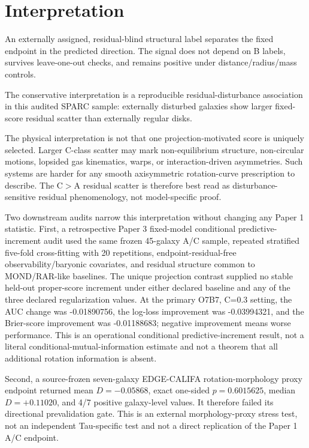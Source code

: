 \documentclass[11pt]{article}
\begin{document}
\section{Interpretation}
An externally assigned, residual-blind structural label separates the fixed endpoint in the predicted direction. The signal does not depend on B labels, survives leave-one-out checks, and remains positive under distance/radius/mass controls.

The conservative interpretation is a reproducible residual-disturbance association in this audited SPARC sample: externally disturbed galaxies show larger fixed-score residual scatter than externally regular disks.

The physical interpretation is not that one projection-motivated score is uniquely selected. Larger C-class scatter may mark non-equilibrium structure, non-circular motions, lopsided gas kinematics, warps, or interaction-driven asymmetries. Such systems are harder for any smooth axisymmetric rotation-curve prescription to describe. The C$>$A residual scatter is therefore best read as disturbance-sensitive residual phenomenology, not model-specific proof.

Two downstream audits narrow this interpretation without changing any Paper 1 statistic. First, a retrospective Paper 3 fixed-model conditional predictive-increment audit used the same frozen 45-galaxy A/C sample, repeated stratified five-fold cross-fitting with 20 repetitions, endpoint-residual-free observability/baryonic covariates, and residual structure common to MOND/RAR-like baselines. The unique projection contrast supplied no stable held-out proper-score increment under either declared baseline and any of the three declared regularization values. At the primary O7B7, C=0.3 setting, the AUC change was -0.01890756, the log-loss improvement was -0.03994321, and the Brier-score improvement was -0.01188683; negative improvement means worse performance. This is an operational conditional predictive-increment result, not a literal conditional-mutual-information estimate and not a theorem that all additional rotation information is absent.

Second, a source-frozen seven-galaxy EDGE-CALIFA rotation-morphology proxy endpoint returned mean $D = -0.05868$, exact one-sided $p = 0.6015625$, median $D = +0.11020$, and 4/7 positive galaxy-level values. It therefore failed its directional prevalidation gate. This is an external morphology-proxy stress test, not an independent Tau-specific test and not a direct replication of the Paper 1 A/C endpoint.
\end{document}
